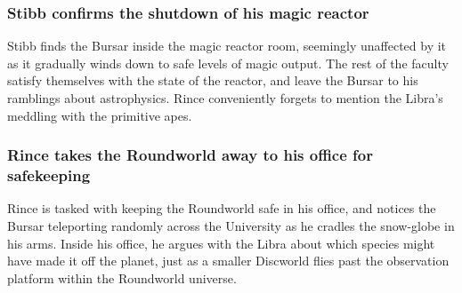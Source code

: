 \subsubsection{\Gls{Stibb} confirms the shutdown of his magic reactor}
\Gls{Stibb} finds the \Gls{Bursar} inside the magic reactor room, seemingly unaffected by it as 
it gradually winds down to safe levels of magic output. The rest of the faculty satisfy themselves 
with the state of the reactor, and leave the \Gls{Bursar} to his ramblings about astrophysics. 
\Gls{Rince} conveniently forgets to mention the \Gls{Libra}'s meddling with the primitive apes.

\subsubsection{\Gls{Rince} takes the Roundworld away to his office for safekeeping}
\Gls{Rince} is tasked with keeping the Roundworld safe in his office, and notices the \Gls{Bursar} 
teleporting randomly across the University as he cradles the snow-globe in his arms. Inside his 
office, he argues with the \Gls{Libra} about which species might have made it off the planet, just 
as a smaller Discworld flies past the observation platform within the Roundworld universe.